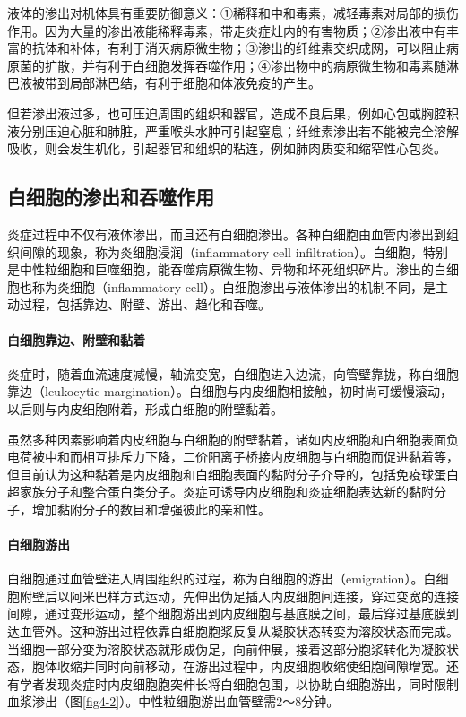 液体的渗出对机体具有重要防御意义：①稀释和中和毒素，减轻毒素对局部的损伤作用。因为大量的渗出液能稀释毒素，带走炎症灶内的有害物质；②渗出液中有丰富的抗体和补体，有利于消灭病原微生物；③渗出的纤维素交织成网，可以阻止病原菌的扩散，并有利于白细胞发挥吞噬作用；④渗出物中的病原微生物和毒素随淋巴液被带到局部淋巴结，有利于细胞和体液免疫的产生。

但若渗出液过多，也可压迫周围的组织和器官，造成不良后果，例如心包或胸腔积液分别压迫心脏和肺脏，严重喉头水肿可引起窒息；纤维素渗出若不能被完全溶解吸收，则会发生机化，引起器官和组织的粘连，例如肺肉质变和缩窄性心包炎。

\subsection{白细胞的渗出和吞噬作用}

炎症过程中不仅有液体渗出，而且还有白细胞渗出。各种白细胞由血管内渗出到组织间隙的现象，称为炎细胞浸润（inflammatory
cell
infiltration）。白细胞，特别是中性粒细胞和巨噬细胞，能吞噬病原微生物、异物和坏死组织碎片。渗出的白细胞也称为炎细胞（inflammatory
cell）。白细胞渗出与液体渗出的机制不同，是主动过程，包括靠边、附壁、游出、趋化和吞噬。

\paragraph{白细胞靠边、附壁和黏着}
炎症时，随着血流速度减慢，轴流变宽，白细胞进入边流，向管壁靠拢，称白细胞靠边（leukocytic
margination）。白细胞与内皮细胞相接触，初时尚可缓慢滚动，以后则与内皮细胞附着，形成白细胞的附壁黏着。

虽然多种因素影响着内皮细胞与白细胞的附壁黏着，诸如内皮细胞和白细胞表面负电荷被中和而相互排斥力下降，二价阳离子桥接内皮细胞与白细胞而促进黏着等，但目前认为这种黏着是内皮细胞和白细胞表面的黏附分子介导的，包括免疫球蛋白超家族分子和整合蛋白类分子。炎症可诱导内皮细胞和炎症细胞表达新的黏附分子，增加黏附分子的数目和增强彼此的亲和性。

\paragraph{白细胞游出}
白细胞通过血管壁进入周围组织的过程，称为白细胞的游出（emigration）。白细胞附壁后以阿米巴样方式运动，先伸出伪足插入内皮细胞间连接，穿过变宽的连接间隙，通过变形运动，整个细胞游出到内皮细胞与基底膜之间，最后穿过基底膜到达血管外。这种游出过程依靠白细胞胞浆反复从凝胶状态转变为溶胶状态而完成。当细胞一部分变为溶胶状态就形成伪足，向前伸展，接着这部分胞浆转化为凝胶状态，胞体收缩并同时向前移动，在游出过程中，内皮细胞收缩使细胞间隙增宽。还有学者发现炎症时内皮细胞胞突伸长将白细胞包围，以协助白细胞游出，同时限制血浆渗出（图\ref{fig4-2}）。中性粒细胞游出血管壁需2～8分钟。

